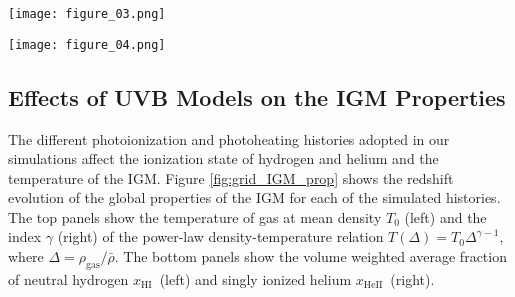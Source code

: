 \documentclass[twocolumn]{aastex62}
\def\HI{\hbox{\rm H~$\scriptstyle\rm I$}}
\def\HeII{\hbox{He~$\scriptstyle\rm II$}}
\newcommand\xHI{$x_{\mathrm{HI}}$~}
\newcommand\xHeII{$x_{\mathrm{HeII}}$~}
\begin{document}
\begin{figure*}
\texttt{[image: figure\_03.png]}
\caption{
Evolution of global properties of the IGM computed form the 400 CHIPS simulations. The simulations evolve under different 
photoionization and photoheating rates resulting in a large variety of ionization and thermal histories of the IGM. The top panels show the 
the temperature, $T_0$, of intergalactic gas at the mean density (left) and the index $\gamma$ from the power-law density-temperature relation    
$T(\Delta) = T_0 \Delta ^{\gamma - 1}$ (right). The bottom panels show the volume-weighted average of the neutral hydrogen fraction \xHI (left) and the singly 
ionized helium fraction \xHeII (right). The amplitude and timing of the rates impact the 
thermal state of the IGM during \HI\ and \HeII\ reionization. Simulations with higher values of $\beta_\mathrm{He}$ result in a higher temperature peak during \HeII\ reionization 
($2.5 \lesssim z \lesssim 3.8 $) and for simulations with $\Delta z_\mathrm{He} >0$ the epoch of \HeII\ reionization is shifted to earlier epochs. Analogously, 
negative values of $\Delta z_\mathrm{H}$ move the timing of \HI\ reionization to later epochs and simulations with different $\beta_\mathrm{H}$ show a 
different temperature peak during \HI\ reionization at $z\sim 5.6 - 6.3$.}
\label{fig:grid_IGM_prop}
\end{figure*}


\begin{figure*}
\texttt{[image: figure\_04.png]}
\caption{Gas temperature from a slice through the IGM at $z=3.6$ in a subset of 20 simulations with different \HeII\ reionization scenarios. An increase 
in the parameters $\beta_{\mathrm{He}}$ and $\Delta z_{\mathrm{He}}$ corresponds to higher \HeII\ photoheating and a shift of the \HeII\ reionization epoch to 
earlier cosmic times (closer to $z\sim 3.6$) respectively. Either effect increases the temperature of the IGM at $z\sim3.6$.}
\label{fig:temperature_slice}
\end{figure*}

\subsection{Effects of UVB Models on the IGM Properties}

 
The different photoionization and photoheating histories adopted in our 
simulations affect the ionization state of hydrogen and helium and  the temperature
of the IGM. Figure \ref{fig:grid_IGM_prop} shows the redshift evolution of the
global properties of the IGM for each of the simulated histories. The top panels show
the temperature of gas at mean density $T_0$ (left) and the index $\gamma$ (right) of the power-law density-temperature 
relation $T(\Delta) = T_0 \Delta ^{\gamma - 1}$, where 
$\Delta = \rho_\mathrm{gas}/\bar{\rho}$. The bottom panels show the volume weighted average 
fraction of neutral hydrogen \xHI (left) and singly ionized helium \xHeII (right).
\end{document}

